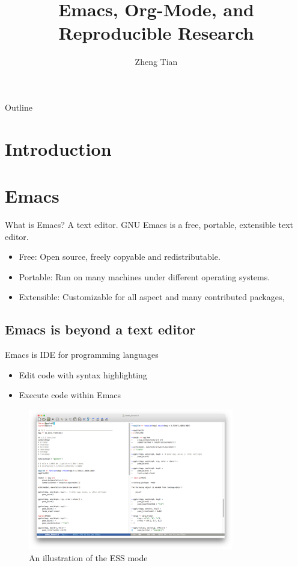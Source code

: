 \documentclass[presentation]{beamer}
\author{Zheng Tian}
\date{}
\title{Emacs, Org-Mode, and Reproducible Research}
\begin{document}
\maketitle
\begin{frame}{Outline}
\setcounter{tocdepth}{1}
\tableofcontents
\end{frame}



\section*{Introduction}
\label{sec:orgebbf723}


\section*{Emacs}
\label{sec:orgbf7100f}

\begin{frame}[label={sec:org586dce5}]{What is Emacs? A text editor.}
GNU Emacs is a free, portable, extensible text editor.

\begin{itemize}
\item Free: Open source, freely copyable and redistributable.
\item Portable: Run on many machines under different operating systems.
\item Extensible: Customizable for all aspect and  many contributed packages,
\end{itemize}
\end{frame}


\subsection*{Emacs is beyond a text editor}
\label{sec:orgd918eb2}

\begin{frame}[label={sec:orgb4fad2f}]{Emacs is IDE for programming languages}
\begin{itemize}
\item Edit code with syntax highlighting
\item Execute code within Emacs
\end{itemize}

\begin{figure}[htbp]
\centering
\includegraphics[width=0.8\textwidth]{figure/r_example.png}
\caption{An illustration of the ESS mode}
\end{figure}
\end{frame}
\end{document}
